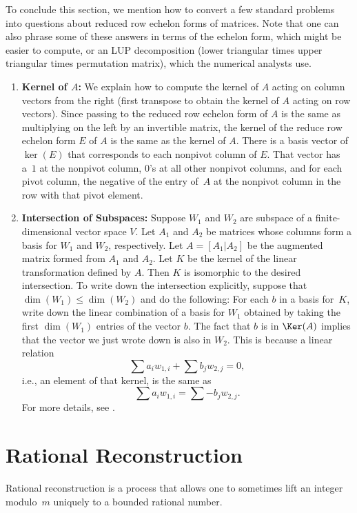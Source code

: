 To conclude this section, we mention how to convert a few standard
problems into questions about reduced row echelon forms of matrices.
Note that one can also phrase some of these answers in terms of the
echelon form, which might be easier to compute, or an LUP
decomposition (lower triangular times upper triangular times
permutation matrix), which the numerical analysts use.
\begin{enumerate}
\item{} {\bf Kernel of $A$:}\label{alg:ker} We explain how to compute
  the kernel of $A$ acting on column vectors from the right (first
  transpose to obtain the kernel of $A$ acting on row vectors).  Since
  passing to the reduced row echelon form of $A$ is the same as
  multiplying on the left by an invertible matrix, the kernel of the
  reduce row echelon form $E$ of $A$ is the same as the kernel of $A$.
  There is a basis vector of $\ker(E)$ that corresponds to each
  nonpivot column of $E$.  That vector has a~$1$ at the nonpivot
  column, $0$'s at all other nonpivot columns, and for each pivot
  column, the negative of the entry of~$A$ at the nonpivot column in
  the row with that pivot element.

\item{} {\bf Intersection of Subspaces:} Suppose $W_1$ and $W_2$ are
  subspace of a finite-dimensional vector space $V$.  Let $A_1$ and
  $A_2$ be matrices whose columns form a basis for $W_1$ and $W_2$,
  respectively.  Let $A=[A_1 | A_2]$ be the augmented matrix formed
  from $A_1$ and $A_2$.  Let $K$ be the kernel of the linear
  transformation defined by $A$.  Then $K$ is isomorphic to the desired
  intersection.  To write down the intersection explicitly, suppose
  that $\dim(W_1) \leq \dim(W_2)$ and do the following: For each $b$ in a
  basis for~$K$, write down the linear combination of a basis for $W_1$
  obtained by taking the first $\dim(W_1)$ entries of the vector $b$.  The
  fact that $b$ is in $\Ker(A)$ implies that the vector we just
  wrote down is also in $W_2$.  
This is because a linear relation
  $$\sum a_i w_{1,i}  + \sum b_j w_{2,j} = 0,$$
i.e., an element of that kernel, is the same
as 
  $$\sum a_i w_{1,i} = \sum -b_j w_{2,j}.$$
For more details, see \cite[Alg.~2.3.9]{cohen:course_ant}.
\end{enumerate}

\section{Rational Reconstruction}
Rational reconstruction is a process that allows one to sometimes lift
an integer modulo~$m$ uniquely to a bounded rational number.

